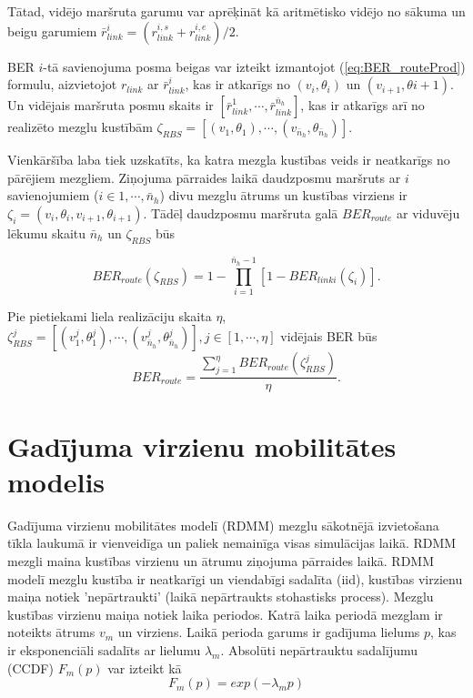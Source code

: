 Tātad, vidējo maršruta garumu var aprēķināt kā aritmētisko vidējo no sākuma un beigu garumiem $\bar{r}_{link}^{i} = (r_{link}^{i,s}+r_{link}^{i,e})/2$.

BER $i$-tā savienojuma posma beigas var izteikt izmantojot (\ref{eq:BER_routeProd}) formulu, aizvietojot $r_{link}$ ar $\bar{r}_{link}^{i}$, kas ir atkarīgs no $(v_{i}, \theta_{i})$ un $(v_{i+1}, \theta{i+1})$. Un vidējais maršruta posmu skaits ir $[\bar{r}_{link}^{1},\cdots, \bar{r}_{link}^{\bar{n}_{h}}]$, kas ir atkarīgs arī no realizēto mezglu kustībām $\zeta_{RBS} = [(v_{1},\theta_{1}),\cdots ,(v_{\bar{n}_{h}}, \theta_{\bar{n}_{h}})]$.

Vienkāršība laba tiek uzskatīts, ka katra mezgla kustības veids ir neatkarīgs no pārējiem mezgliem. Ziņojuma pārraides laikā daudzposmu maršruts ar $i$ savienojumiem ($i \in {1,\cdots ,\bar{n}_{h}}$) divu mezglu ātrums un kustības virziens ir $\zeta_{i} = (v_{i},\theta_{i},v_{i+1}, \theta_{i+1})$. Tādēļ daudzposmu maršruta galā $BER_{route}$ ar viduvēju lēkumu skaitu $\bar{n}_{h}$ un $\zeta_{RBS}$ būs \cite{qoS_mobility}

\begin{equation}
BER_{route}(\zeta_{RBS}) = 1-\prod_{i=1}^{\bar{n}_{h}-1}\left[1-BER_{link i}(\zeta_{i})\right].
\end{equation}

Pie pietiekami liela realizāciju skaita $\eta$, $\zeta_{RBS}^{j} = [(v^{j}_{1}, \theta^{j}_{1}), \cdots,(v^{j}_{\bar{n}_{h}}, \theta^{j}_{\bar{n}_{h}})], j\in[1, \cdots,\eta]$ vidējais BER būs
\begin{equation}
BER_{route}=\frac{\sum_{j=1}^{\eta}BER_{route}\left(\zeta_{RBS}^{j}\right)}{\eta}.
\end{equation}



\section{Gadījuma virzienu mobilitātes modelis}
Gadījuma virzienu mobilitātes modelī (\acs{RDMM}) mezglu sākotnējā izvietošana tīkla laukumā ir vienveidīga un paliek nemainīga visas simulācijas laikā. RDMM mezgli maina kustības virzienu un ātrumu ziņojuma pārraides laikā. RDMM modelī mezglu kustība ir neatkarīgi un viendabīgi sadalīta (\acs{iid}), kustības virzienu maiņa notiek 'nepārtraukti' (laikā nepārtraukts stohastisks process). Mezglu kustības virzienu maiņa notiek laika periodos. Katrā laika periodā mezglam ir noteikts ātrums $v_{m}$ un virziens. Laikā perioda garums ir gadījuma lielums $p$, kas ir eksponenciāli sadalīts ar lielumu $\lambda_{m}$. Absolūti nepārtrauktu sadalījumu (\acs{CCDF}) $F_{m}(p)$ var izteikt kā \cite{camp}
\begin{equation}
F_{m}(p)=exp(-\lambda_{m}p)
\end{equation}

